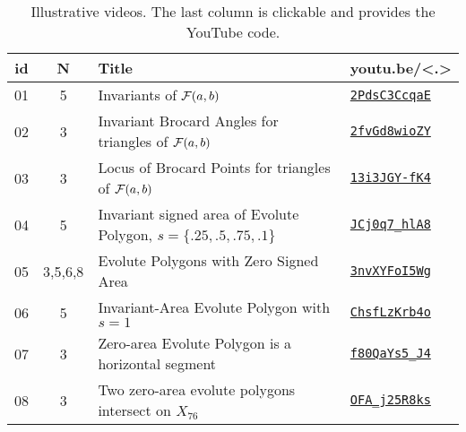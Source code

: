\begin{table}[H]
\small
\begin{tabular}{|c|c|l|l|}
\hline
id & N & Title & \textbf{youtu.be/<.>}\\
\hline
01 & 5 & {Invariants of $\mathcal{F}(a,b)$} &
\href{https://youtu.be/2PdsC3CcqaE}{\texttt{2PdsC3CcqaE}}\\
02 & 3 & {Invariant Brocard Angles for triangles of $\mathcal{F}(a,b)$} & \href{https://youtu.be/2fvGd8wioZY}{\texttt{2fvGd8wioZY}} \\
03 & 3 & {Locus of Brocard Points for triangles of $\mathcal{F}(a,b)$} & \href{https://youtu.be/13i3JGY-fK4}{\texttt{13i3JGY-fK4}}\\
04 & 5 & {Invariant signed area of Evolute Polygon, $s=\{.25,.5,.75,.1\}$} & \href{https://youtu.be/JCj0q7_hlA8}{\texttt{JCj0q7\_hlA8}} \\
05 & 3,5,6,8 & {Evolute Polygons with Zero Signed Area} & \href{https://youtu.be/3nvXYFoI5Wg}{\texttt{3nvXYFoI5Wg}} \\
06 & 5 & {Invariant-Area Evolute Polygon with $s=1$} & \href{https://youtu.be/ChsfLzKrb4o}{\texttt{ChsfLzKrb4o}} \\
07 & 3 & {Zero-area Evolute Polygon is a horizontal segment} & \href{https://youtu.be/f80QaYs5_J4}{\texttt{f80QaYs5\_J4}} \\
08 & 3 & {Two zero-area evolute polygons intersect on $X_{76}$} & \href{https://youtu.be/OFA_j25R8ks}{\texttt{OFA\_j25R8ks}} \\
\hline
\end{tabular}
\caption{Illustrative videos. The last column is clickable and provides the YouTube code.}
\label{tab:playlist}
\end{table}

